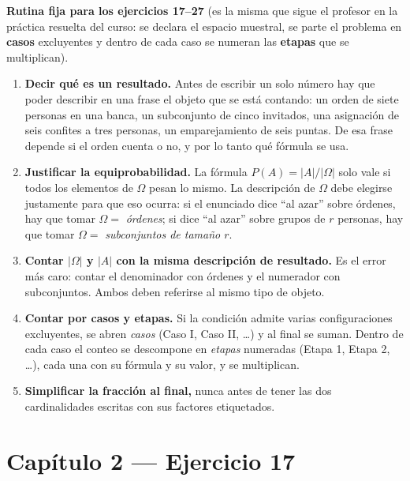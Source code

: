 \documentclass[11pt]{article}
\begin{document}
\begin{tip}
\textbf{Rutina fija para los ejercicios 17--27} (es la misma que sigue el profesor en la pr\'actica resuelta del curso: se declara el espacio muestral, se parte el problema en \textbf{casos} excluyentes y dentro de cada caso se numeran las \textbf{etapas} que se multiplican).
\begin{enumerate}[leftmargin=*]
  \item \textbf{Decir qu\'e es un resultado.} Antes de escribir un solo n\'umero hay que poder describir en una frase el objeto que se est\'a contando: un orden de siete personas en una banca, un subconjunto de cinco invitados, una asignaci\'on de seis confites a tres personas, un emparejamiento de seis puntas. De esa frase depende si el orden cuenta o no, y por lo tanto qu\'e f\'ormula se usa.
  \item \textbf{Justificar la equiprobabilidad.} La f\'ormula $P(A)=|A|/|\Omega|$ solo vale si todos los elementos de $\Omega$ pesan lo mismo. La descripci\'on de $\Omega$ debe elegirse justamente para que eso ocurra: si el enunciado dice ``al azar'' sobre \'ordenes, hay que tomar $\Omega=$ \emph{\'ordenes}; si dice ``al azar'' sobre grupos de $r$ personas, hay que tomar $\Omega=$ \emph{subconjuntos de tama\~no $r$}.
  \item \textbf{Contar $|\Omega|$ y $|A|$ con la misma descripci\'on de resultado.} Es el error m\'as caro: contar el denominador con \'ordenes y el numerador con subconjuntos. Ambos deben referirse al mismo tipo de objeto.
  \item \textbf{Contar por casos y etapas.} Si la condici\'on admite varias configuraciones excluyentes, se abren \emph{casos} (Caso I, Caso II, \dots) y al final se suman. Dentro de cada caso el conteo se descompone en \emph{etapas} numeradas (Etapa 1, Etapa 2, \dots), cada una con su f\'ormula y su valor, y se multiplican.
  \item \textbf{Simplificar la fracci\'on al final,} nunca antes de tener las dos cardinalidades escritas con sus factores etiquetados.
\end{enumerate}
\end{tip}

\section*{Cap\'itulo 2 --- Ejercicio 17}
\end{document}
